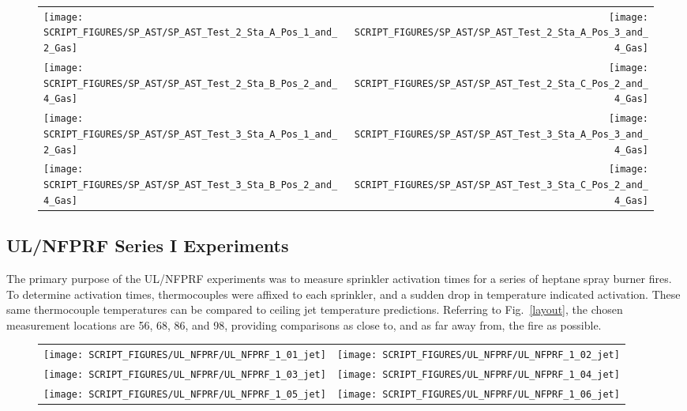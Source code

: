 \newpage

\begin{figure}[p]
\begin{tabular*}{\textwidth}{l@{\extracolsep{\fill}}r}
\texttt{[image: SCRIPT\_FIGURES/SP\_AST/SP\_AST\_Test\_2\_Sta\_A\_Pos\_1\_and\_2\_Gas]} &
\texttt{[image: SCRIPT\_FIGURES/SP\_AST/SP\_AST\_Test\_2\_Sta\_A\_Pos\_3\_and\_4\_Gas]} \\
\texttt{[image: SCRIPT\_FIGURES/SP\_AST/SP\_AST\_Test\_2\_Sta\_B\_Pos\_2\_and\_4\_Gas]} &
\texttt{[image: SCRIPT\_FIGURES/SP\_AST/SP\_AST\_Test\_2\_Sta\_C\_Pos\_2\_and\_4\_Gas]} \\
\texttt{[image: SCRIPT\_FIGURES/SP\_AST/SP\_AST\_Test\_3\_Sta\_A\_Pos\_1\_and\_2\_Gas]} &
\texttt{[image: SCRIPT\_FIGURES/SP\_AST/SP\_AST\_Test\_3\_Sta\_A\_Pos\_3\_and\_4\_Gas]} \\
\texttt{[image: SCRIPT\_FIGURES/SP\_AST/SP\_AST\_Test\_3\_Sta\_B\_Pos\_2\_and\_4\_Gas]} &
\texttt{[image: SCRIPT\_FIGURES/SP\_AST/SP\_AST\_Test\_3\_Sta\_C\_Pos\_2\_and\_4\_Gas]}
\end{tabular*}
\label{SP_Test_2_3_Gas}
\end{figure}


\clearpage

\subsection{UL/NFPRF Series I Experiments}

The primary purpose of the UL/NFPRF experiments was to measure sprinkler activation times for a series of heptane spray burner fires. To determine activation times, thermocouples were affixed to each sprinkler, and a sudden drop in temperature indicated activation. These same thermocouple temperatures can be compared to ceiling jet temperature predictions. Referring to Fig.~\ref{layout}, the chosen measurement locations are 56, 68, 86, and 98, providing comparisons as close to, and as far away from, the fire as possible.


\begin{figure}[h!]
\begin{tabular*}{\textwidth}{l@{\extracolsep{\fill}}r}
\texttt{[image: SCRIPT\_FIGURES/UL\_NFPRF/UL\_NFPRF\_1\_01\_jet]} &
\texttt{[image: SCRIPT\_FIGURES/UL\_NFPRF/UL\_NFPRF\_1\_02\_jet]} \\
\texttt{[image: SCRIPT\_FIGURES/UL\_NFPRF/UL\_NFPRF\_1\_03\_jet]} &
\texttt{[image: SCRIPT\_FIGURES/UL\_NFPRF/UL\_NFPRF\_1\_04\_jet]} \\
\texttt{[image: SCRIPT\_FIGURES/UL\_NFPRF/UL\_NFPRF\_1\_05\_jet]} &
\texttt{[image: SCRIPT\_FIGURES/UL\_NFPRF/UL\_NFPRF\_1\_06\_jet]}
\end{tabular*}
\label{UL_NFPRF_jet_1}
\end{figure}

